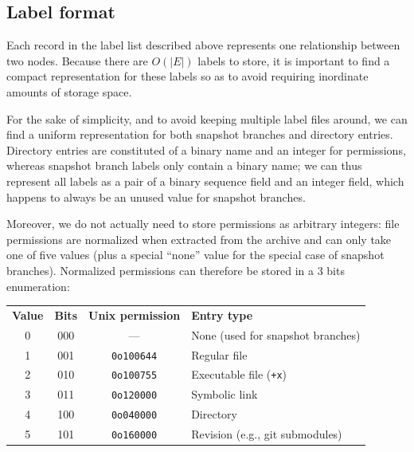 \subsection{Label format}
\label{sec:label-format}

Each record in the label list described above represents one relationship
between two nodes. Because there are $O(|E|)$ labels to store, it is important
to find a compact representation for these labels so as to avoid requiring
inordinate amounts of storage space.

For the sake of simplicity, and to avoid keeping multiple label files around,
we can find a uniform representation for both snapshot branches and directory
entries. Directory entries are constituted of a binary name and an integer for
permissions, whereas snapshot branch labels only contain a binary name; we can
thus represent all labels as a pair of a binary sequence field and an integer
field, which happens to always be an unused value for snapshot branches.

Moreover, we do not actually need to store permissions as arbitrary integers:
file permissions are normalized when extracted from the archive and can only
take one of five values (plus a special ``none'' value for the special case of
snapshot branches).  Normalized permissions can therefore be stored in a 3 bits
enumeration:

\begin{table}[H]
    \centering
\begin{tabular}{c c c l}
    \textbf{Value} & \textbf{Bits} & \textbf{Unix permission} & \textbf{Entry type} \\
    0 & 000 & --- & None (used for snapshot branches) \\
    1 & 001 & \texttt{0o100644} & Regular file \\
    2 & 010 & \texttt{0o100755} & Executable file (\texttt{+x}) \\
    3 & 011 & \texttt{0o120000} & Symbolic link \\
    4 & 100 & \texttt{0o040000} & Directory \\
    5 & 101 & \texttt{0o160000} & Revision (e.g., git submodules)
\end{tabular}
\end{table}

